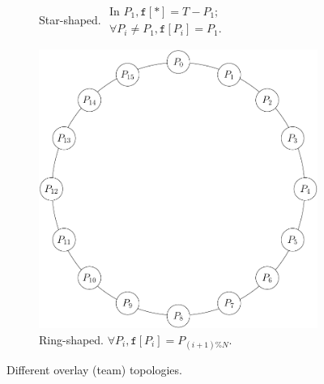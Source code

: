\begin{figure}
\begin{subfigure}[t]{0.3\textwidth}
    \caption{Star-shaped.  \newline $\begin{array}{l} \mbox{In $P_1$}, \mathtt{f}[*] = T-P_1; \\ \mbox{$\forall P_i\neq P_1$}, \mathtt{f}[P_i] = P_1. \end{array}$}
    \label{fig:star}
  \end{subfigure}
  \hfill
  \begin{subfigure}[t]{0.3\textwidth}
    \centering
    \includegraphics[width=\textwidth]{graphics/ring}
    \caption{Ring-shaped. \newline $\forall P_i, \mathtt{f}[P_i]=P_{(i+1)\%N}$.}
    \label{fig:ring}
  \end{subfigure}
  \caption{Different overlay (team) topologies.}
  \label{fig:three_topos}
\end{figure}


